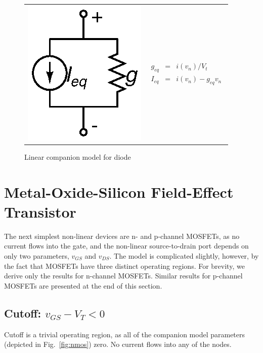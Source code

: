 \documentclass{article}
\begin{document}
\begin{figure}[h]
\begin{center}
\begin{tabular}{m{3cm}<{\centering}m{3cm}<{\centering}}
	\includegraphics{fig/diode.eps} & 
	\begin{eqnarray*}
		g_{eq}&=&i(v_n)/V_t \\
		I_{eq}&=&i(v_n)-g_{eq}v_n
	\end{eqnarray*}
\end{tabular}
\caption{Linear companion model for diode \label{fig:diode}}
\end{center}
\end{figure}

\pagebreak

\section{Metal-Oxide-Silicon Field-Effect Transistor}

The next simplest non-linear devices are n- and p-channel MOSFETs, as no current flows into the gate, and the non-linear source-to-drain port depends on only two parameters, $v_{GS}$ and $v_{DS}$.   The model is complicated slightly, however, by the fact that MOSFETs have three distinct operating regions.  For brevity, we derive only the results for n-channel MOSFETs.  Similar results for p-channel MOSFETs are presented at the end of this section.

\subsection{Cutoff: $ v_{GS} - V_T < 0 $ }

Cutoff is a trivial operating region, as all of the companion model parameters (depicted in Fig.~\ref{fig:nmos}) zero.  No current flows into any of the nodes.
\end{document}
